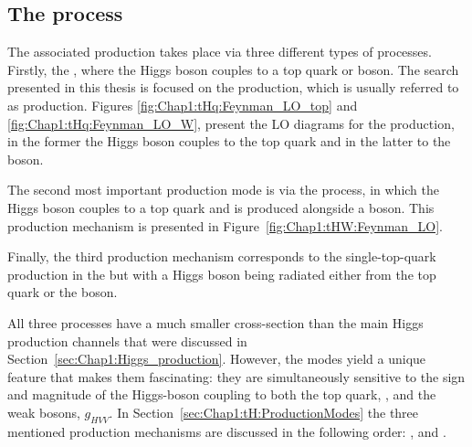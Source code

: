 

\subsection{The \tH process}
\label{sec:Chap1:tHq}

The associated \tH production takes place via three different types of processes.
Firstly, the \tchannel, where the Higgs boson couples to a top quark or \PW boson.
The search presented in this thesis is focused on the \tH \tchannel production, which 
is usually referred to as \tHq production.
Figures \ref{fig:Chap1:tHq:Feynman_LO_top} and \ref{fig:Chap1:tHq:Feynman_LO_W}, 
present the LO diagrams for the \tHq production, in the former the Higgs boson couples
to the top quark and in the latter to the \PW boson.


The second most important production mode is via the \tW process, in which the
Higgs boson couples to a top quark and is produced alongside a \PW boson.
This production mechanism is presented in Figure~\ref{fig:Chap1:tHW:Feynman_LO}.

Finally, the third \tH production mechanism corresponds to the 
single-top-quark production in the \schannel but with a Higgs
boson being radiated either from the top quark or
the \PW boson.

All three processes have a much smaller cross-section than the main Higgs production channels that were
discussed in Section~\ref{sec:Chap1:Higgs_production}. However, the \tH modes yield a unique feature
that makes them fascinating: they are simultaneously sensitive to the sign and magnitude of the Higgs-boson coupling to both
the top quark, \yt, and the weak bosons, $g_{HVV}$. In Section~\ref{sec:Chap1:tH:ProductionModes} the three
mentioned \tH production mechanisms are discussed in the following order: \tHq, \tWH and \schannel. 

